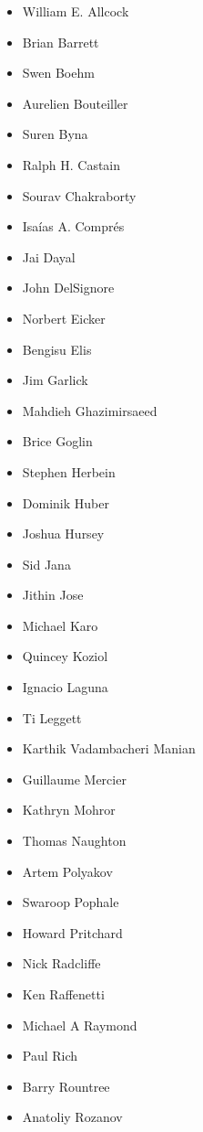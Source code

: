 \begin{itemize}
    \item William E. Allcock
    \item Brian Barrett
    \item Swen Boehm
    \item Aurelien Bouteiller
    \item Suren Byna
    \item Ralph H. Castain
    \item Sourav Chakraborty
    \item Isaías A. Comprés
    \item Jai Dayal
    \item John DelSignore
    \item Norbert Eicker
    \item Bengisu Elis
    \item Jim Garlick
    \item Mahdieh Ghazimirsaeed
    \item Brice Goglin
    \item Stephen Herbein
    \item Dominik Huber
    \item Joshua Hursey
    \item Sid Jana
    \item Jithin Jose
    \item Michael Karo
    \item Quincey Koziol
    \item Ignacio Laguna
    \item Ti Leggett
    \item Karthik Vadambacheri Manian
    \item Guillaume Mercier
    \item Kathryn Mohror
    \item Thomas Naughton
    \item Artem Polyakov
    \item Swaroop Pophale
    \item Howard Pritchard
    \item Nick Radcliffe
    \item Ken Raffenetti
    \item Michael A Raymond
    \item Paul Rich
    \item Barry Rountree
    \item Anatoliy Rozanov

\end{itemize}
